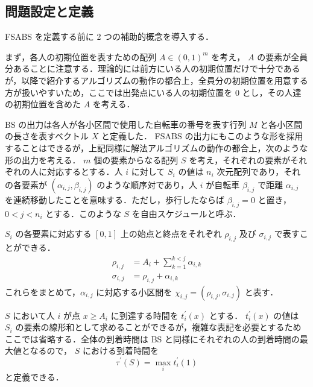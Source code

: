 \subsection{問題設定と定義}

FSABS を定義する前に 2 つの補助的概念を導入する．

まず，各人の初期位置を表すための配列 $A \in {(0, 1)}^{m}$ を考え， $A$ の要素が全員分あることに注意する．理論的には前方にいる人の初期位置だけで十分であるが，以降で紹介するアルゴリズムの動作の都合上，全員分の初期位置を用意する方が扱いやすいため，ここでは出発点にいる人の初期位置を 0 とし，その人達の初期位置を含めた $A$ を考える．

BS の出力は各人が各小区間で使用した自転車の番号を表す行列 $M$ と各小区間の長さを表すベクトル $X$ と定義した． FSABS の出力にもこのような形を採用することはできるが，上記同様に解法アルゴリズムの動作の都合上，次のような形の出力を考える． $m$ 個の要素からなる配列 $S$ を考え，それぞれの要素がそれぞれの人に対応するとする．人 $i$ に対して $S_i$ の値は $n_i$ 次元配列であり，それの各要素が $(\alpha_{i,j}, \beta_{i,j})$ のような順序対であり，人 $i$ が自転車 $\beta_{i,j}$ で距離 $\alpha_{i,j}$ を連続移動したことを意味する．ただし，歩行したならば $\beta_{i,j} = 0$ と置き， $0 < j < n_i$ とする．このような $S$ を自由スケジュールと呼ぶ．

$S_i$ の各要素に対応する $[0, 1]$ 上の始点と終点をそれぞれ $\rho_{i,j}$ 及び $\sigma_{i,j}$ で表すことができる．
\begin{align}
  \rho_{i,j} &= A_i + \sum_{k=1}^{k < j}\alpha_{i, k} \\
  \sigma_{i,j} &= \rho_{i,j} + \alpha_{i, k}
\end{align}
これらをまとめて，$\alpha_{i,j}$ に対応する小区間を $\chi_{i,j} = (\rho_{i,j}, \sigma_{i,j})$ と表す．

$S$ において人 $i$ が点 $x \geq A_i$ に到達する時間を $t^{\prime}_i(x)$ とする． $t^{\prime}_i(x)$ の値は $S_i$ の要素の線形和として求めることができるが，複雑な表記を必要とするためここでは省略する．全体の到着時間は BS と同様にそれぞれの人の到着時間の最大値となるので， $S$ における到着時間を
\begin{equation}
  \tau^\prime(S) = \max_i t^{\prime}_i(1)
\end{equation}
と定義できる．

